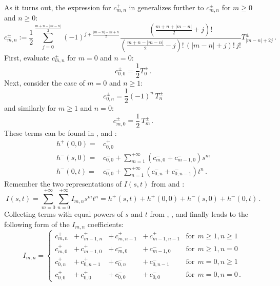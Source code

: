 As it turns out, the expression for $c^{+}_{m,n}$ in 
generalizes further to $c^{\pm}_{m,n}$ for $m \geq 0$ and $n \geq 0$:
\begin{equation}
    c^{\pm}_{m,n}
  := \frac{1}{2}
    \sum\limits_{j=0}^{\frac{m+n-|m-n|}{2}}
      (-1)^{j+\frac{|m-n|-m+n}{2}}
      \frac{\left(\frac{m+n+|m-n|}{2} +j \right)!}
           {\left(\frac{m+n-|m-n|}{2} -j \right)!\, (|m-n|+j)!\, j!}
      T^{\pm}_{|m-n|+2j} \, . \label{eqn:c_pm_mn}
\end{equation}
First, evaluate $c^{\pm}_{m,n}$ for $m=0$ and $n=0$:
\begin{equation}
  c^{\pm}_{0,0} = \frac{1}{2} T^{\pm}_0 \, .
\end{equation}
Next, consider the case of $m=0$ and $n \geq 1$:
\begin{equation}
  c^{\pm}_{0,n} = \frac{1}{2} (-1)^n \,T^{\pm}_n
\end{equation}
and similarly for $m \geq 1$ and $n=0$:
\begin{equation}
  c^{\pm}_{m,0} = \frac{1}{2} \,T^{\pm}_m \, .
\end{equation}
These terms can be found in ,  and :
\begin{align}
  h^{+}(0,0) =& c^{+}_{0,0} \label{eqn:h_p_00_c_mn} \\
  h^{-}(s,0) =& c^{-}_{0,0} + \sum\limits_{m=1}^{+\infty} \left( c^{-}_{m,0} + c^{-}_{m-1,0} \right) s^m \label{eqn:h_m_s0_c_mn} \\
  h^{-}(0,t) =& c^{-}_{0,0} + \sum\limits_{n=1}^{+\infty} \left( c^{-}_{0,n} + c^{-}_{0,n-1} \right) t^n \label{eqn:h_m_0t_c_mn} \, .
\end{align}
Remember the two representations of $I(s,t)$ from  and :
\begin{equation*}
 I(s,t) = \sum\limits_{m=0}^{+\infty}
          \sum\limits_{n=0}^{+\infty}
            I_{m,n} s^m t^n
        = h^{+}(s,t) + h^{+}(0,0) + h^{-}(s,0) + h^{-}(0,t)
        \, .
\end{equation*}
Collecting terms with equal powers of $s$ and $t$
from , ,  and 
finally leads to the following form of the $I_{m,n}$ coefficients:
\begin{equation}
 I_{m,n} = \left\{
           \begin{array}{lllll}
             c^{+}_{m,n} &+\, c^{+}_{m-1,n} &+\, c^{+}_{m,n-1} &+\, c^{+}_{m-1,n-1} &\textrm{for}~~ m \geq 1 , n \geq 1 \\
             c^{+}_{m,0} &+\, c^{+}_{m-1,0} &+\, c^{-}_{m,0}   &+\, c^{-}_{m-1,0}   &\textrm{for}~~ m \geq 1 , n = 0 \\
             c^{+}_{0,n} &+\, c^{+}_{0,n-1} &+\, c^{-}_{0,n}   &+\, c^{-}_{0,n-1}   &\textrm{for}~~ m = 0    , n \geq 1 \\
             c^{+}_{0,0} &+\, c^{+}_{0,0}   &+\, c^{-}_{0,0}   &+\, c^{-}_{0,0}     &\textrm{for}~~ m = 0    , n = 0 \, .
           \end{array} \right. \label{eqn:Imn}
\end{equation}

